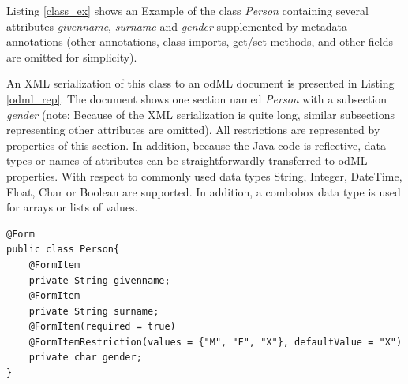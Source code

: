 \documentclass[conference]{IEEEtran}
\begin{document}
Listing \ref{class_ex} shows an Example of the class \textit{Person} containing several attributes \textit{givenname}, \textit{surname} and \textit{gender} supplemented by metadata annotations (other annotations, class imports, get/set methods, and other fields are omitted for simplicity).

An XML serialization of this class to an odML document is presented in Listing \ref{odml_rep}. The document shows one section named \textit{Person} with a subsection \textit{gender} (note: Because of the XML serialization is quite long, similar subsections representing other attributes are omitted). All restrictions are represented by properties of this section. In addition, because the Java code is reflective, data types or names of attributes can be straightforwardly transferred to odML properties. With respect to commonly used data types String, Integer, DateTime, Float, Char or Boolean are supported. In addition, a combobox data type is used for arrays or lists of values.


\scriptsize
\begin{lstlisting}[label=class_ex,caption=Java Class Example]
@Form
public class Person{
	@FormItem
	private String givenname;
	@FormItem
	private String surname;
	@FormItem(required = true)
	@FormItemRestriction(values = {"M", "F", "X"}, defaultValue = "X")
	private char gender;
}
\end{lstlisting}
\normalsize
\end{document}
